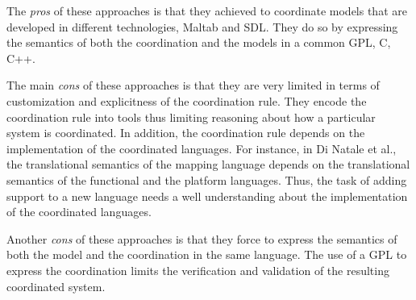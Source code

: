 The \emph{pros} of these approaches is that they achieved to coordinate models that are developed in different technologies, \ie Maltab and SDL. They do so by expressing the semantics of both the coordination and the models in a common GPL, \ie C, C++. 

The main \emph{cons} of these approaches is that they are very limited in terms of customization and explicitness of the coordination rule. They encode the coordination rule into tools thus limiting reasoning about how a particular system is coordinated. In addition, the coordination rule depends on the implementation of the coordinated languages. For instance, in Di Natale et al., the translational semantics of the mapping language depends on the translational semantics of the functional and the platform languages. Thus, the task of adding support to a new language needs a well understanding about the implementation of the coordinated languages.

Another \emph{cons} of these approaches is that they force to express the semantics of both the model and the coordination in the same language. The use of a GPL to express the coordination limits the verification and validation of the resulting coordinated system. 
	


